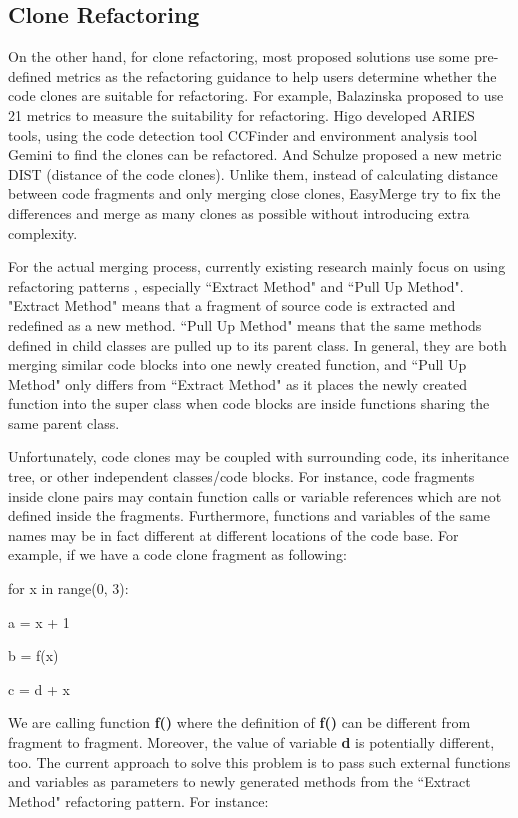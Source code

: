 \documentclass{acm_proc_article-sp}
\begin{document}
\subsection{Clone Refactoring}
On the other hand, for clone refactoring, most proposed solutions use some pre-defined metrics as the refactoring guidance to help users determine whether the 
code clones are suitable for refactoring. For example, Balazinska \cite{balazinska} proposed to use 21 metrics to measure the suitability for refactoring. Higo \cite{higo}
developed ARIES tools, using the code detection tool CCFinder and environment analysis tool Gemini to find the clones can be refactored. And Schulze \cite{schulze}
proposed a new metric DIST (distance of the code clones). Unlike them, instead of calculating distance between code fragments and only merging close clones, EasyMerge 
try to fix the differences and merge as many clones as possible without introducing extra complexity.

For the actual merging process, currently existing research mainly focus on using refactoring patterns \cite{fowler}, especially ``Extract Method" and ``Pull Up Method".
"Extract Method" means that a fragment of source code is extracted and redefined as a new method. ``Pull Up Method" means that the same methods defined in child
classes are pulled up to its parent class. In general, they are both merging similar code blocks into one newly created function, and ``Pull Up Method" only differs from 
``Extract Method" as it places the newly created function into the super class when code blocks are inside functions sharing the same parent class.

Unfortunately, code clones may be coupled with surrounding code, its inheritance tree, or other independent classes/code blocks. For instance, code fragments inside clone pairs
may contain function calls or variable references which are not defined inside the fragments. Furthermore, functions and variables of the same names may be in fact different
at different locations of the code base. For example, if we have a code clone fragment as following:

\IncMargin{1em}
\begin{algorithm}
	for x in range(0, 3):
	
		\Indp a = x + 1
		
		b = f(x)
		
		c = d + x
\end{algorithm}
\DecMargin{1em}

We are calling function {\bf f()} where the definition of {\bf f()} can be different from fragment to fragment. Moreover, the value of variable {\bf d} is potentially different, too.
The current approach to solve this problem is to pass such external functions and variables as parameters to newly generated methods from the ``Extract Method" refactoring pattern.
For instance:
\end{document}
